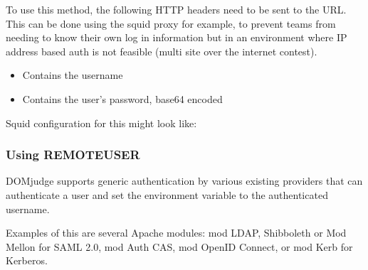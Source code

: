 \documentclass[a4paper,10pt,english,openany]{sphinxmanual}
\begin{document}
\sphinxAtStartPar
To use this method, the following HTTP headers need to be sent to the
 URL. This can be done using the squid proxy for example, to
prevent teams from needing to know their own log in information but in an
environment where IP address based auth is not feasible (multi site over the
internet contest).
\begin{itemize}
\item {} 
\sphinxAtStartPar
{} \sphinxhyphen{} Contains the username

\item {} 
\sphinxAtStartPar
{}  \sphinxhyphen{} Contains the user’s password, base64 encoded

\end{itemize}

\sphinxAtStartPar
Squid configuration for this might look like:

\begin{sphinxVerbatim}[commandchars=\\\{\}]
   
   
   
\end{sphinxVerbatim}


\subsubsection{Using REMOTE\sphinxhyphen{}USER}
\label{\detokenize{config-advanced:using-remote-user}}
\sphinxAtStartPar
DOMjudge supports generic authentication by various existing providers that
can authenticate a user and set the  environment variable
to the authenticated username.

\sphinxAtStartPar
Examples of this are several Apache modules: mod LDAP, Shibboleth or
Mod Mellon for SAML 2.0, mod Auth CAS, mod OpenID Connect, or mod Kerb for
Kerberos.
\end{document}
